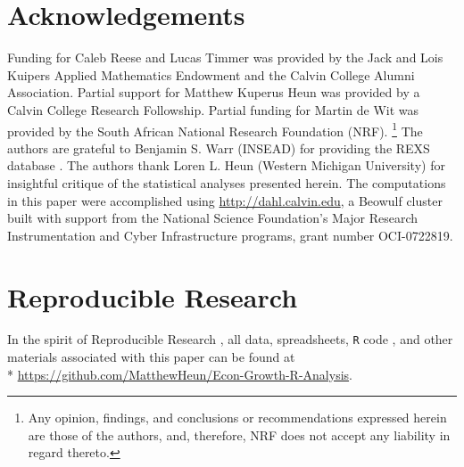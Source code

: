 \documentclass[preprint,authoryear,12pt]{elsarticle}\usepackage[]{graphicx}\usepackage[]{color}
\begin{document}
\section*{Acknowledgements}
\label{sec:Acknowledgements}

Funding for Caleb Reese and Lucas Timmer was provided 
by the Jack and Lois Kuipers Applied Mathematics Endowment and 
the Calvin College Alumni Association. 
Partial support for Matthew Kuperus Heun was 
provided by a Calvin College Research Followship. 
Partial funding for Martin de Wit was provided 
by the South African National Research Foundation (NRF).%
  \footnote{
  Any opinion, 
  findings, and conclusions or recommendations expressed herein are those 
  of the authors, and, therefore, NRF does not accept any liability in regard thereto.
  }
The authors are grateful to Benjamin S. Warr (INSEAD) for providing 
the REXS database \citep{Warr:2012a}. 
The authors thank Loren L. Heun (Western Michigan University) 
for insightful critique of the statistical analyses presented herein.
The computations in this paper were accomplished using \url{http://dahl.calvin.edu}, 
a Beowulf cluster built with support from the National Science Foundation's 
Major Research Instrumentation and Cyber Infrastructure programs, 
grant number OCI-0722819.


\section*{Reproducible Research}

In the spirit of Reproducible Research \citep{Gandrud:2013vx}, 
all data, spreadsheets, \texttt{R} code \citep{R}, and other materials 
associated with this paper can be found at\\*
\protect\url{https://github.com/MatthewHeun/Econ-Growth-R-Analysis}.

\end{document}
